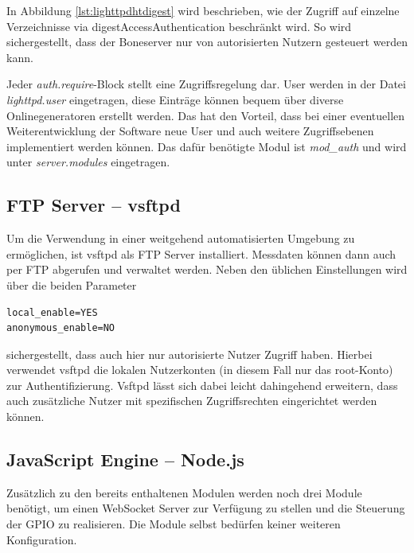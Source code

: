 \documentclass[thesis.tex]{subfiles}
\begin{document}
In Abbildung \ref{lst:lighttpdhtdigest} wird beschrieben, wie der Zugriff auf einzelne Verzeichnisse via \gls{digestAccessAuthentication} beschränkt wird. So wird sichergestellt, dass der Boneserver nur von autorisierten Nutzern gesteuert werden kann.

Jeder \textit{auth.require}-Block stellt eine Zugriffsregelung dar. User werden in der Datei \textit{lighttpd.user} eingetragen, diese Einträge können bequem über diverse Onlinegeneratoren erstellt werden. Das hat den Vorteil, dass bei einer eventuellen Weiterentwicklung der Software neue User und auch weitere Zugriffsebenen implementiert werden können. Das dafür benötigte Modul ist \textit{mod\_auth} und wird unter \textit{server.modules} eingetragen.


\subsection{FTP Server -- vsftpd}
\label{subsec:vsftpd}
Um die Verwendung in einer weitgehend automatisierten Umgebung zu ermöglichen, ist vsftpd als FTP Server installiert. Messdaten können dann auch per FTP abgerufen und verwaltet werden. Neben den üblichen Einstellungen wird über die beiden Parameter

\begin{lstlisting}
local_enable=YES
anonymous_enable=NO
\end{lstlisting}
sichergestellt, dass auch hier nur autorisierte Nutzer Zugriff haben. Hierbei verwendet vsftpd die lokalen Nutzerkonten (in diesem Fall nur das root-Konto) zur Authentifizierung. Vsftpd lässt sich dabei leicht dahingehend erweitern, dass auch zusätzliche Nutzer mit spezifischen Zugriffsrechten eingerichtet werden können.


\subsection{JavaScript Engine -- Node.js}

Zusätzlich zu den bereits enthaltenen Modulen werden noch drei Module benötigt, um einen WebSocket Server zur Verfügung zu stellen und die Steuerung der GPIO zu realisieren. Die Module selbst bedürfen keiner weiteren Konfiguration.
\end{document}
